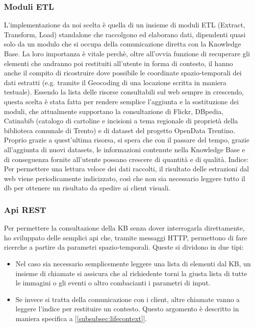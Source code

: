 \documentclass[sigproc-sp.tex]{subfiles}
\begin{document}
\subsubsection{Moduli ETL}
L’implementazione da noi scelta è quella di un insieme di moduli ETL (Extract, Transform, Load) standalone che raccolgono ed elaborano dati, dipendenti quasi solo da un modulo che si occupa della comunicazione diretta con la Knowledge Base. La loro importanza è vitale perchè, oltre all’ovvia funzione di recuperare gli elementi che andranno poi restituiti all’utente in forma di contesto, il hanno anche il compito di ricostruire dove possibile le coordinate spazio-temporali dei dati estratti (e.g. tramite il Geocoding di una locazione scritta in maniera testuale). Essendo la lista delle risorse consultabili sul web sempre in crescendo, questa scelta è stata fatta per rendere semplice l’aggiunta e la sostituzione dei moduli, che attualmente supportano la consultazione di Flickr, DBpedia, Catinabib (catalogo di cartoline e incisioni a tema regionale di proprietà della biblioteca comunale di Trento) e di dataset del progetto OpenData Trentino. Proprio grazie a quest’ultima risorsa, si spera che con il passare del tempo, grazie all’aggiunta di nuovi datasets, le informazioni contenute nella Knowledge Base e di conseguenza fornite all’utente possano crescere di quantità e di qualità. 
Indice: Per permettere una lettura veloce dei dati raccolti, il risultato delle estrazioni dal web viene periodicamente indicizzato, così che non sia necessario leggere tutto il db per ottenere un risultato da spedire ai client visuali.

\subsubsection{Api REST}
Per permettere la consultazione della KB senza dover interrogarla direttamente, ho sviluppato delle semplici api che, tramite messaggi HTTP, permettono di fare ricerche a partire da parametri spazio-temporali. Queste si dividono in due tipi:
\begin{itemize}
\item Nel caso sia necessario semplicemente leggere una lista di elementi dal KB, un insieme di chiamate si assicura che al richiedente torni la giusta lista di tutte le immagini o gli eventi o altro combacianti i parametri di input.
\item Se invece si tratta della comunicazione con i client, altre chiamate vanno a leggere l’indice per restituire un contesto. Questo argomento è descritto in maniera specifica a [\ref{subsubsec:lifecontext}].
\end{itemize}
\end{document}
